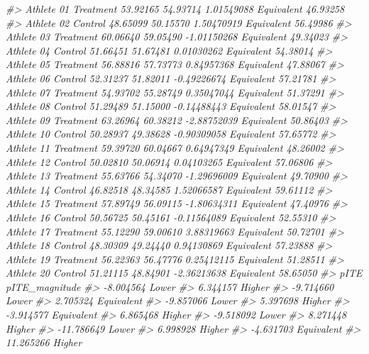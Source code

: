 \documentclass[
]{book}
\newenvironment{Shaded}{\begin{snugshade}}{\end{snugshade}}
\newcommand{\CommentTok}[1]{\textcolor[rgb]{0.56,0.35,0.01}{\textit{#1}}}
\begin{document}
\begin{Shaded}
\begin{Highlighting}[]
\CommentTok{\#>  Athlete 01 Treatment 53.92165  54.93714  1.01549088 Equivalent       46.93258}
\CommentTok{\#>  Athlete 02   Control 48.65099  50.15570  1.50470919 Equivalent       56.49986}
\CommentTok{\#>  Athlete 03 Treatment 60.06640  59.05490 {-}1.01150268 Equivalent       49.34023}
\CommentTok{\#>  Athlete 04   Control 51.66451  51.67481  0.01030262 Equivalent       54.38014}
\CommentTok{\#>  Athlete 05 Treatment 56.88816  57.73773  0.84957368 Equivalent       47.88067}
\CommentTok{\#>  Athlete 06   Control 52.31237  51.82011 {-}0.49226674 Equivalent       57.21781}
\CommentTok{\#>  Athlete 07 Treatment 54.93702  55.28749  0.35047044 Equivalent       51.37291}
\CommentTok{\#>  Athlete 08   Control 51.29489  51.15000 {-}0.14488443 Equivalent       58.01547}
\CommentTok{\#>  Athlete 09 Treatment 63.26964  60.38212 {-}2.88752039 Equivalent       50.86403}
\CommentTok{\#>  Athlete 10   Control 50.28937  49.38628 {-}0.90309058 Equivalent       57.65772}
\CommentTok{\#>  Athlete 11 Treatment 59.39720  60.04667  0.64947349 Equivalent       48.26002}
\CommentTok{\#>  Athlete 12   Control 50.02810  50.06914  0.04103265 Equivalent       57.06806}
\CommentTok{\#>  Athlete 13 Treatment 55.63766  54.34070 {-}1.29696009 Equivalent       49.70900}
\CommentTok{\#>  Athlete 14   Control 46.82518  48.34585  1.52066587 Equivalent       59.61112}
\CommentTok{\#>  Athlete 15 Treatment 57.89749  56.09115 {-}1.80634311 Equivalent       47.40976}
\CommentTok{\#>  Athlete 16   Control 50.56725  50.45161 {-}0.11564089 Equivalent       52.55310}
\CommentTok{\#>  Athlete 17 Treatment 55.12290  59.00610  3.88319663 Equivalent       50.72701}
\CommentTok{\#>  Athlete 18   Control 48.30309  49.24440  0.94130869 Equivalent       57.23888}
\CommentTok{\#>  Athlete 19 Treatment 56.22363  56.47776  0.25412115 Equivalent       51.28511}
\CommentTok{\#>  Athlete 20   Control 51.21115  48.84901 {-}2.36213638 Equivalent       58.65050}
\CommentTok{\#>        pITE pITE\_magnitude}
\CommentTok{\#>   {-}8.004564          Lower}
\CommentTok{\#>    6.344157         Higher}
\CommentTok{\#>   {-}9.714660          Lower}
\CommentTok{\#>    2.705324     Equivalent}
\CommentTok{\#>   {-}9.857066          Lower}
\CommentTok{\#>    5.397698         Higher}
\CommentTok{\#>   {-}3.914577     Equivalent}
\CommentTok{\#>    6.865468         Higher}
\CommentTok{\#>   {-}9.518092          Lower}
\CommentTok{\#>    8.271448         Higher}
\CommentTok{\#>  {-}11.786649          Lower}
\CommentTok{\#>    6.998928         Higher}
\CommentTok{\#>   {-}4.631703     Equivalent}
\CommentTok{\#>   11.265266         Higher}

\end{Highlighting}
\end{Shaded}
\end{document}
